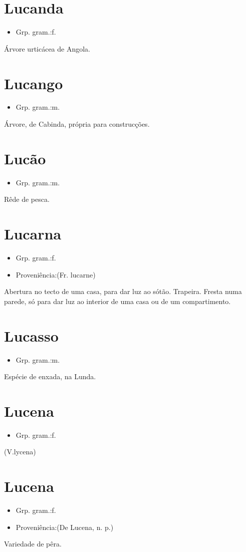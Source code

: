 \section{Lucanda}
\begin{itemize}
\item {Grp. gram.:f.}
\end{itemize}
Árvore urticácea de Angola.
\section{Lucango}
\begin{itemize}
\item {Grp. gram.:m.}
\end{itemize}
Árvore, de Cabinda, própria para construcções.
\section{Lucão}
\begin{itemize}
\item {Grp. gram.:m.}
\end{itemize}
Rêde de pesca.
\section{Lucarna}
\begin{itemize}
\item {Grp. gram.:f.}
\end{itemize}
\begin{itemize}
\item {Proveniência:(Fr. \textunderscore lucarne\textunderscore )}
\end{itemize}
Abertura no tecto de uma casa, para dar luz ao sótão.
Trapeira.
Fresta numa parede, só para dar luz ao interior de uma casa ou de um compartimento.
\section{Lucasso}
\begin{itemize}
\item {Grp. gram.:m.}
\end{itemize}
Espécie de enxada, na Lunda.
\section{Lucena}
\begin{itemize}
\item {Grp. gram.:f.}
\end{itemize}
(V.lycena)
\section{Lucena}
\begin{itemize}
\item {Grp. gram.:f.}
\end{itemize}
\begin{itemize}
\item {Proveniência:(De \textunderscore Lucena\textunderscore , n. p.)}
\end{itemize}
Variedade de pêra.

